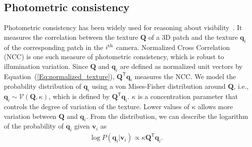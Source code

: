 \documentclass[10pt,twocolumn,letterpaper]{article}
\begin{document}


%
%

\subsection{Photometric consistency}\label{sub:Photo-Cue}
Photometric consistency has been widely used for reasoning about visibility~\cite{Snavely:2006,Frahm:2010,Furukawa:2010,Furukawa2008,Devernay2006}. It measures the correlation between the texture $\mathbf{Q}$ of a 3D patch and the texture $\mathbf{q}_i$ of the corresponding patch in the $i^{\rm th}$ camera. Normalized Cross Correlation (NCC) is one such measure of photometric consistency, which is robust to illumination variation. Since $\mathbf{Q}$ and $\mathbf{q}_i$ are defined as normalized unit vectors by Equation~(\ref{Eq:normalized_texture}), $\mathbf{Q}^\mathsf{T}\mathbf{q}_i$ measures the NCC. We model the probability distribution of $\mathbf{q}_i$ using a von Mises-Fisher distribution around $\mathbf{Q}$, i.e., $\mathbf{q}_i\sim \mathcal{V}(\mathbf{Q}, \kappa)$, which is defined by $\mathbf{Q}^\mathsf{T}\mathbf{q}_i$. $\kappa$ is a concentration parameter that controls the degree of variation of the texture. Lower values of $\kappa$ allows more variation between $\mathbf{Q}$ and $\mathbf{q}_i$. From the distribution, we can describe the logarithm of the probability of $\mathbf{q}_i$ given $\mathbf{v}_i$ as 
\begin{eqnarray}
\log P(\mathbf{q}_i | \mathbf{v}_i) \propto \kappa\mathbf{Q}^\mathsf{T}\mathbf{q}_i.
\label{eq:eq_appearance}
\end{eqnarray}
\end{document}

